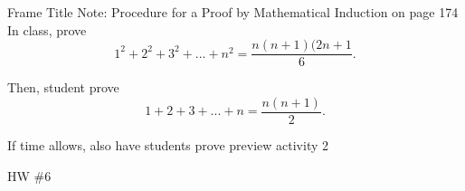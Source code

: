 \documentclass{beamer}
\begin{document}
\begin{frame}{Frame Title}
    Note: Procedure for a Proof by Mathematical Induction on page 174\\
    
    In class, prove 
    \[
    1^2 + 2^2 + 3^2 + ... + n^2 = \frac{n(n+1)(2n+1}{6}.
    \]
    
    Then, student prove
    \[
    1 + 2 + 3 + ... + n = \frac{n(n+1)}{2}.
    \]
    
    If time allows, also have students prove preview activity 2
    
    HW \#6
\end{frame}
\end{document}

